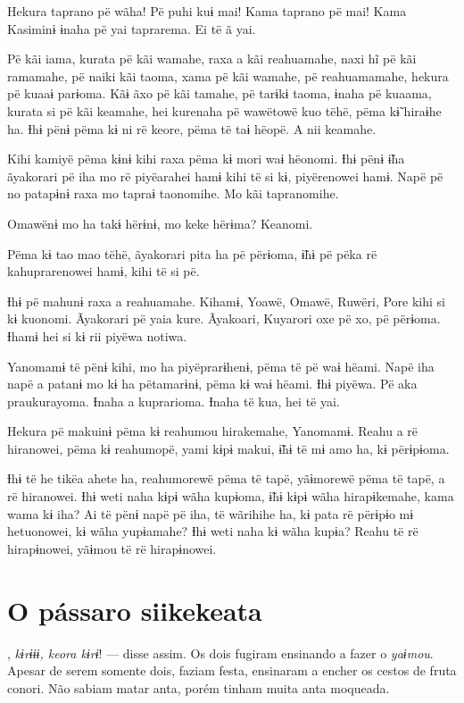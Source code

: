 Hekura taprano pë wãha! Pë puhi kuɨ mai! Kama taprano pë mai! Kama
Kasiminɨ ɨnaha pë yai taprarema. Ei të ã yai. 

Pë kãi iama, kurata pë kãi wamahe, raxa a kãi reahuamahe, naxi hĩ pë kãi
ramamahe, pë naiki kãi taoma, xama pë kãi wamahe, pë reahuamamahe,
hekura pë kuaaɨ parɨoma. Kãɨ ãxo pë kãi tamahe, pë tarɨkɨ taoma, ɨnaha
pë kuaama, kurata si pë kãi keamahe, hei kurenaha pë wawëtowë kuo tëhë,
pëma kɨ̃ hiraɨhe ha. Ɨhɨ pënɨ pëma kɨ ni rë keore, pëma të taɨ hëopë. A nii keamahe. 

Kihi kamiyë pëma kɨnɨ kihi raxa pëma kɨ mori waɨ hëonomi. Ɨhɨ pënɨ ɨ̃ha
ãyakorari pë iha mo rë piyëarahei hamɨ kihi të si kɨ, piyërenowei hamɨ.
Napë pë no patapɨnɨ raxa mo tapraɨ taonomihe. Mo kãi tapranomihe. 

Omawënɨ mo ha takɨ hërɨnɨ, mo keke hërɨma? Keanomi. 

Pëma kɨ tao mao tëhë, ãyakorari pita ha pë përɨoma, ɨ̃hɨ pë pëka rë
kahuprarenowei hamɨ, kihi të si pë. 

Ɨhɨ pë mahunɨ raxa a reahuamahe. Kihamɨ, Yoawë, Omawë, Ruwëri, Pore kihi
si kɨ kuonomi. Ãyakorari pë yaia kure. Ãyakoari, Kuyarori oxe pë xo, pë
përɨoma. Ɨhamɨ hei si kɨ rii piyëwa notiwa. 

Yanomamɨ të pënɨ kihi, mo ha piyëprarɨhenɨ, pëma të pë waɨ hëami. Napë
iha napë a patanɨ mo kɨ ha pëtamarɨnɨ, pëma kɨ waɨ hëami. Ɨhɨ piyëwa. Pë
aka praukurayoma. Ɨnaha a kuprarioma. Ɨnaha të kua, hei të yai. 

Hekura pë makuinɨ pëma kɨ reahumou hirakemahe, Yanomamɨ. Reahu a rë
hiranowei, pëma kɨ reahumopë, yami kɨpɨ makui, ɨ̃hɨ të mɨ amo ha, kɨ
përɨpɨoma. 

Ɨhɨ të he tikëa ahete ha, reahumorewë pëma të tapë, yãɨmorewë pëma të
tapë, a rë hiranowei. Ɨhɨ weti naha kɨpɨ wãha kupɨoma, ɨ̃hɨ kɨpɨ wãha
hirapɨkemahe, kama wama kɨ iha? Ai të pënɨ napë pë iha, të wãrihihe ha,
kɨ pata rë përɨpɨo mɨ hetuonowei, kɨ wãha yupɨamahe? Ɨhɨ weti naha kɨ
wãha kupɨa? Reahu të rë hirapɨnowei, yãɨmou të rë hirapɨnowei. 

\chapter{O pássaro siikekeata}
 
, \textit{kɨrɨɨɨ, keora kɨrɨ}! --- disse assim. Os dois fugiram ensinando a fazer o \textit{yaɨmou}. Apesar de serem somente dois, faziam festa, ensinaram a encher os cestos de fruta
conori. Não sabiam matar anta, porém tinham muita anta moqueada. 

